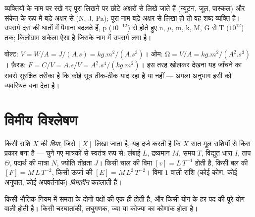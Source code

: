 \begin{remark}[नाम और संकेत]\label{rem:b1:units-dimensions:names}
व्यक्तियों के नाम पर रखे गए  पूरा लिखने पर छोटे अक्षरों से लिखे जाते हैं
(न्यूटन, जूल, पास्कल) और संकेत के रूप में बड़े अक्षर से (\unit{N}, \unit{J},
\unit{Pa}); पूरा नाम बड़े अक्षर से लिखा हो तो वह शब्द व्यक्ति है। उपसर्ग दस की
घातों में पैमाना बदलते हैं, p ($10^{-12}$) से होते हुए n, $\mu$, m, k, M, G
से T ($10^{12}$) तक; किलोग्राम अकेला ऐसा  है जिसके नाम में उपसर्ग
लगा है।
\end{remark}

\begin{example}[एक व्युत्पन्न मात्रक को खोलकर देखना]\label{ex:b1:units-dimensions:unpack}
वोल्ट: $\unit{V} = \unit{W/A} = \unit{J/(A.s)} = \unit{kg.m^2/(A.s^3)}$।
ओम: $\unit{\ohm} = \unit{V/A} = \unit{kg.m^2/(A^2.s^3)}$। फ़ैरड:
$\unit{F} = \unit{C/V} = \unit{A.s/V} = \unit{A^2.s^4/(kg.m^2)}$। इस तरह
खोलकर देखना यह जाँचने का सबसे सुरक्षित तरीका है कि कोई सूत्र ठीक-ठीक याद रहा
है या नहीं --- अगला अनुभाग इसी को व्यवस्थित बना देता है।
\end{example}

\section{विमीय विश्लेषण}

\begin{definition}[विमा]\label{def:b1:units-dimensions:dimension}
किसी राशि $X$ की \emph{विमा}, जिसे $[X]$ लिखा जाता है, यह दर्ज करती है कि $X$
सात मूल राशियों से किस प्रकार बना है --- चुने गए मात्रकों से स्वतंत्र रूप से:
लंबाई $L$, द्रव्यमान $M$, समय $T$, विद्युत धारा $I$, ताप $\Theta$, पदार्थ की
मात्रा $N$, ज्योति तीव्रता $J$। किसी चाल की विमा $[v] = L\,T^{-1}$ होती है,
किसी बल की $[F] = M\,L\,T^{-2}$, किसी ऊर्जा की $[E] = M\,L^2\,T^{-2}$। विमा
$1$ वाली राशि (कोई कोण, कोई अनुपात, कोई अपवर्तनांक) \emph{विमाहीन}
कहलाती है।
\end{definition}

\begin{theorem}[विमीय समांगता का सिद्धांत]\label{thm:b1:units-dimensions:homogeneity}
किसी भौतिक नियम में समता के दोनों पक्षों की  एक ही होती है, और किसी योग के
हर पद की  पूरे योग वाली होती है। किसी चरघातांकी, लघुगणक, ज्या या कोज्या
का कोणांक  होता है।
\end{theorem}


